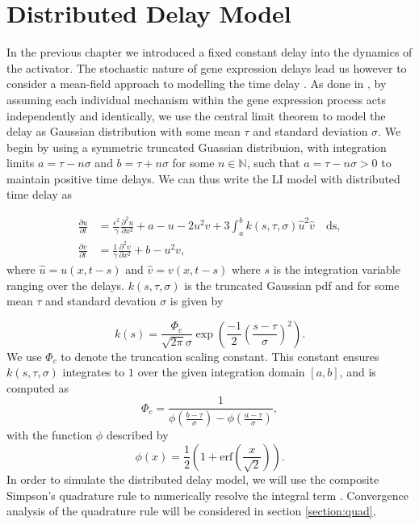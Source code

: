 \chapter{Distributed Delay Model}

In the previous chapter we introduced a fixed constant delay into the dynamics of the activator. The stochastic nature of gene expression delays lead us however to consider a mean-field approach to modelling the time delay \cite{bratsun,krausenew}. As done in \cite{william}, by assuming each individual mechanism within the gene expression process acts independently and identically, we use the central limit theorem to model the delay as Gaussian distribution with some mean $\tau$ and standard deviation $\sigma$. We begin by using a symmetric truncated Guassian distribuion, with integration limits $a=\tau-n\sigma$ and $b=\tau+n\sigma$ for some $n\in\mathbb{N}$, such that $a=\tau-n\sigma>0$ to maintain positive time delays. We can thus write the LI model with distributed time delay as

\begin{equation}
  \begin{split}
    \frac{\partial u}{\partial t}&=\frac{\epsilon^2}{\gamma}\frac{\partial^2u}{\partial x^2}+a-u-2u^2v+3\int_{a}^{b}k(s,\tau,\sigma)\hat{u}^2\hat{v} \quad\text{ds},\\
    \frac{\partial v}{\partial t}&=\frac{1}{\gamma}\frac{\partial^2v}{\partial x^2}+b-u^2v,
\end{split}
\end{equation}
where $\hat{u}=u(x,t-s)$ and $\hat{v}=v(x,t-s)$ where $s$ is the integration variable ranging over the delays. $k(s,\tau,\sigma)$ is the truncated Gaussian pdf and for some mean $\tau$ and standard devation $\sigma$ is given by \cite{wikitrunc}

\begin{equation}
  k(s)=\frac{\Phi_c}{\sqrt{2\pi}\sigma}\exp\left(\frac{-1}{2}\left(\frac{s-\tau}{\sigma}\right)^2\right).
\end{equation}
We use $\Phi_c$ to denote the truncation scaling constant. This constant ensures $k(s,\tau,\sigma)$ integrates to $1$ over the given integration domain $[a, b]$, and is computed as
\begin{equation}
\Phi_c=\frac{1}{\phi\left(\frac{b-\tau}{\sigma}\right)-\phi\left(\frac{a-\tau}{\sigma}\right)},
\end{equation}
with the function $\phi$ described by
\begin{equation}
\phi(x)=\frac{1}{2}\left(1+\text{erf}\left(\frac{x}{\sqrt{2}}\right)\right).
\end{equation}
In order to simulate the distributed delay model, we will use the composite Simpson's quadrature rule to numerically resolve the integral term \cite{compsimp}. Convergence analysis of the quadrature rule will be considered in section \ref{section:quad}.

